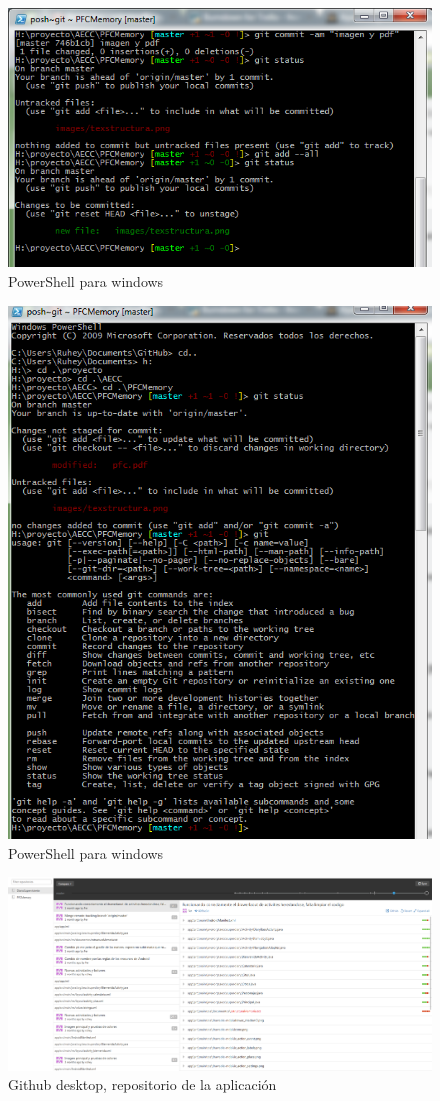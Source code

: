 \documentclass[../pfc.tex]{subfiles}
\begin{document}
	\begin{figure}[h]
		\centering
		\includegraphics[width=0.7\linewidth]{../images/powershellcommit}
		\caption{PowerShell para windows}
		\label{fig:powershellcommit}
	\end{figure}
	


	\begin{figure}[h]
		\centering
		\includegraphics[width=0.7\linewidth]{../images/powerShell}
		\caption{PowerShell para windows}
		\label{fig:powershell}
	\end{figure}

	
	\begin{figure}[h]
		\centering
		\includegraphics[width=0.7\linewidth]{../images/githubdesktopAplication}
		\caption{Github desktop, repositorio de la aplicación}
		\label{fig:ghdesktopA}
	\end{figure}
\end{document}
